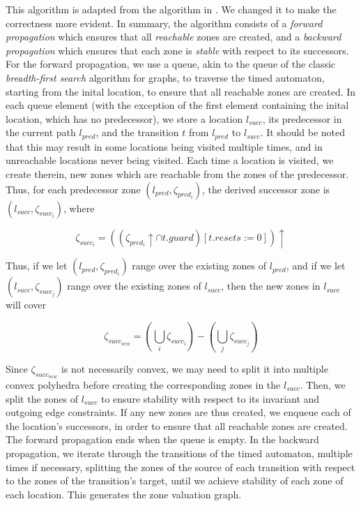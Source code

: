\documentclass{article}
\begin{document}
This algorithm is adapted from the algorithm in
\cite{DBLP:conf/cav/GuhaNA12}. We changed it to make the correctness
more evident. 
In summary, the algorithm consists of a \emph{forward
  propagation} which ensures that all \emph{reachable} zones are created, and a
\emph{backward propagation} which ensures that each zone is \emph{stable} with
respect to its successors. For the forward propagation, we use a queue,
akin to the queue of the classic \emph{breadth-first search} algorithm
for graphs, to traverse the timed automaton, starting from the inital
location, to ensure that all reachable zones are created. In each
queue element (with the exception of the first element containing the
inital location, which has no predecessor), we store a location
$l_{succ}$, its predecessor in the current path $l_{pred}$, and the
transition $t$ from $l_{pred}$ to $l_{succ}$. It should be noted
that this may result in some locations being visited multiple times,
and in unreachable locations never being visited. Each time a location
is visited, we create therein, new zones which are reachable from the
zones of the predecessor. \\
Thus, for each predecessor zone $(l_{pred}, \zeta _{pred_{i}})$, the
derived successor zone is $(l_{succ}, \zeta _{succ_{i}})$, where

\begin{displaymath} 
\zeta _{succ_{i}} = ((\zeta _{pred_{i}} \uparrow \cap t.guard)[t.resets := 0]) \uparrow
\end{displaymath} 

Thus, if we let  $(l_{pred}, \zeta _{pred_{i}})$ range over the
existing zones of $l_{pred}$, and if we let  $(l_{succ}, \zeta
_{succ_{j}})$ range over the existing zones of $l_{succ}$, then the
new zones in $l_{succ}$ will cover

\begin{displaymath} 
\zeta _{succ_{new}} = (\bigcup _{i} \zeta_{succ_{i}}) - (\bigcup _{j} \zeta_{succ_{j}})
\end{displaymath} 

Since $\zeta _{succ_{new}}$ is not necessarily convex, we may need to
split it into multiple convex polyhedra before creating the
corresponding zones in the $l_{succ}$. Then, we split the zones of
$l_{succ}$ to ensure stability with respect to
its invariant and outgoing edge constraints. If any new
zones are thus created, we enqueue each of the location's successors,
in order to ensure that all reachable zones are created. The forward
propagation ends when the queue is empty. In the backward propagation, we
iterate through the transitions of the timed automaton, multiple times
if necessary, splitting the zones of the source of each transition
with respect to the zones of the transition's target, until we achieve
stability of each zone of each location. This generates the zone
valuation graph.
\end{document}
